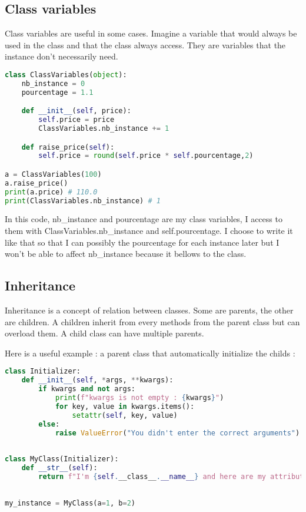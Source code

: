 \documentclass[a4paper, 12pt, titlepage]{scrartcl} %
\begin{document}
\subsection{Class variables}
Class variables are useful in some cases. Imagine a variable that would always be used in the class and that the class always access. They are variables that the instance don't necessarily need.
\begin{lstlisting}[language=Python]
class ClassVariables(object):
	nb_instance = 0
	pourcentage = 1.1

	def __init__(self, price):
		self.price = price
		ClassVariables.nb_instance += 1

	def raise_price(self):
		self.price = round(self.price * self.pourcentage,2)

a = ClassVariables(100)
a.raise_price()
print(a.price) # 110.0
print(ClassVariables.nb_instance) # 1
\end{lstlisting} \vspace{5mm}
In this code, nb\_instance and pourcentage are my class variables, I access to them with ClassVariables.nb\_instance and self.pourcentage. I choose to write it like that so that I can possibly the pourcentage for each instance later but I won't be able to affect nb\_instance because it bellows to the class.

\subsection{Inheritance}
Inheritance is a concept of relation between classes. Some are parents, the other are children. A children inherit from every methods from the parent class but can overload them. A child class can have multiple parents.

\vspace{5mm}

Here is a useful example : a parent class that automatically initialize the childs :
\begin{lstlisting}[language=Python]
class Initializer:
    def __init__(self, *args, **kwargs):
        if kwargs and not args:
            print(f"kwargs is not empty : {kwargs}")
            for key, value in kwargs.items():
                setattr(self, key, value)
        else:
            raise ValueError("You didn't enter the correct arguments")
 
 
class MyClass(Initializer):
    def __str__(self):
        return f"I'm {self.__class__.__name__} and here are my attributes : {self.__dict__}"
 
 
my_instance = MyClass(a=1, b=2)
\end{lstlisting} \vspace{5mm}
\end{document}
